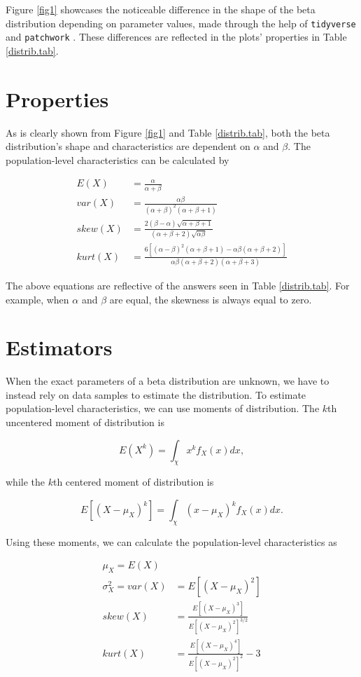 \documentclass{article}\usepackage[]{graphicx}\usepackage[]{xcolor}
\begin{document}
\begin{multicols}{2}
Figure \ref{fig1} showcases the noticeable difference in the shape of the beta distribution depending on parameter values, made through the help of \texttt{tidyverse} and \texttt{patchwork} \citep{tidyverse, patchwork}. These differences are reflected in the plots' properties in Table \ref{distrib.tab}. 


\section{Properties}
As is clearly shown from Figure \ref{fig1} and Table \ref{distrib.tab}, both the beta distribution's shape and characteristics are dependent on $\alpha$ and $\beta$. The population-level characteristics can be calculated by

\begin{align*}
E(X) &= \frac{\alpha}{\alpha + \beta} \tag{The Mean} \\
var(X) &= \frac{\alpha\beta}{(\alpha + \beta)^2(\alpha + \beta + 1)} \tag{The variance} \\
skew(X) &= \frac{2(\beta-\alpha)\sqrt{\alpha + \beta + 1}}{(\alpha + \beta + 2)\sqrt{\alpha\beta}} \tag{The Skewness} \\
kurt(X) &= \frac{6[(\alpha-\beta)^2(\alpha+\beta+1)-\alpha\beta(\alpha+\beta+2)]}{\alpha\beta(\alpha+\beta+2)(\alpha+\beta+3)} \tag{The Excess Kurtosis}
\end{align*}

The above equations are reflective of the answers seen in Table \ref{distrib.tab}. For example, when $\alpha$ and $\beta$ are equal, the skewness is always equal to zero.

\section{Estimators}
When the exact parameters of a beta distribution are unknown, we have to instead rely on data samples to estimate the distribution. To estimate population-level characteristics, we can use moments of distribution. The $k$th uncentered moment of distribution is 

\[E(X^k) = \int_\chi x^kf_X(x)dx,\]

while the $k$th centered moment of distribution is

\[E[(X-\mu_X)^k] = \int_\chi (x-\mu_X)^kf_X(x)dx.\]

Using these moments, we can calculate the population-level characteristics as

\begin{align*}
\mu_X = E(X) & \tag{The Mean} \\ 
\sigma^2_X = var(X) &= E[(X-\mu_X)^2] \tag{The Variance} \\
skew(X) &= \frac{E[(X-\mu_X)^3]}{E[(X-\mu_X)^2]^{3/2}} \tag{The Skewness} \\
kurt(X) &= \frac{E[(X-\mu_X)^4]}{E[(X-\mu_X)^2]^2}-3 \tag{The Excess Kurtosis}
\end{align*}


\end{multicols}
\end{document}
